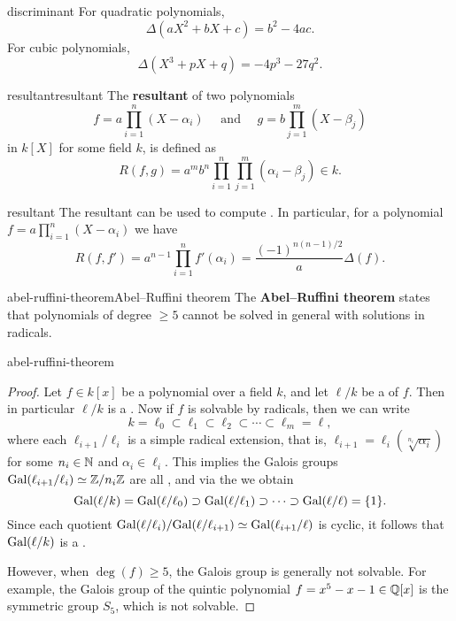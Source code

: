 \begin{example}{discriminant}
    For quadratic polynomials,
    \[ \Delta(aX^2 + bX + c) = b^2 - 4ac . \]
    For cubic polynomials,
    \[ \Delta(X^3 + pX + q) = -4p^3 - 27q^2 . \]
\end{example}

\begin{topic}{resultant}{resultant}
    The \textbf{resultant} of two polynomials
    \[ f = a \prod_{i = 1}^{n} (X - \alpha_i) \quad \text{ and } \quad g = b \prod_{j = 1}^{m} (X - \beta_j) \]
    in $k[X]$ for some field $k$, is defined as
    \[ R(f, g) = a^m b^n \prod_{i = 1}^{n} \prod_{j = 1}^{m} (\alpha_i - \beta_j) \in k . \]
\end{topic}

\begin{example}{resultant}
    The resultant can be used to compute . In particular, for a polynomial $f = a \prod_{i = 1}^{n} (X - \alpha_i)$ we have
    \[ R(f, f') = a^{n - 1} \prod_{i = 1}^{n} f'(\alpha_i) = \frac{(-1)^{n(n - 1)/2}}{a} \Delta(f) . \]
\end{example}

\begin{topic}{abel-ruffini-theorem}{Abel--Ruffini theorem}
    The \textbf{Abel--Ruffini theorem} states that polynomials of degree $\ge 5$ cannot be solved in general with solutions in radicals.
\end{topic}

\begin{example}{abel-ruffini-theorem}
    \begin{proof}
        Let $f \in k[x]$ be a polynomial over a field $k$, and let $\ell/k$ be a  of $f$. Then in particular $\ell/k$ is a . Now if $f$ is solvable by radicals, then we can write
        \[ k = \ell_0 \subset \ell_1 \subset \ell_2 \subset \cdots \subset \ell_m = \ell , \]
        where each $\ell_{i + 1}/\ell_i$ is a simple radical extension, that is, $\ell_{i + 1} = \ell_i(\sqrt[n_i]{\alpha_i})$ for some $n_i \in \mathbb{N}$ and $\alpha_i \in \ell_i$. This implies the Galois groups $\textup{Gal}(\ell_{i + 1}/\ell_i) \simeq \mathbb{Z}/n_i\mathbb{Z}$ are all , and via the  we obtain
        \[ \textup{Gal}(\ell/k) = \textup{Gal}(\ell/\ell_0) \supset \textup{Gal}(\ell/\ell_1) \supset \cdots \supset \textup{Gal}(\ell/\ell) = \{ 1 \} . \]
        Since each quotient $\textup{Gal}(\ell/\ell_i) / \textup{Gal}(\ell/\ell_{i + 1}) \simeq \textup{Gal}(\ell_{i + 1}/\ell)$ is cyclic, it follows that $\textup{Gal}(\ell/k)$ is a .
        
        However, when $\deg(f) \ge 5$, the Galois group is generally not solvable. For example, the Galois group of the quintic polynomial $f = x^5 - x - 1 \in \mathbb{Q}[x]$ is the symmetric group $S_5$, which is not solvable.
    \end{proof}
\end{example}

